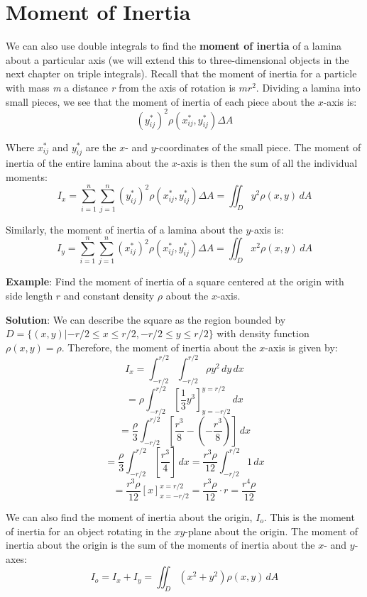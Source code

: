 \section{Moment of Inertia}
We can also use double integrals to find the \textbf{moment of inertia} of a lamina about a particular axis (we will extend this to 
three-dimensional objects in the next chapter on triple integrals). Recall that the
moment of inertia for a particle with mass \textit{m} a distance \textit{r} 
from the axis of rotation is $mr^2$. Dividing a lamina into small pieces, we 
see that the moment of inertia of each piece about the $x$-axis is:
$$\left( y_{ij}^* \right)^2 \rho \left( x_{ij}^* , y_{ij}^* \right) \Delta A$$

Where $x_{ij}^*$ and $y_{ij}^*$ are the $x$- and $y$-coordinates of the small 
piece. The moment of inertia of the entire lamina about the $x$-axis is then 
the sum of all the individual moments:
$$I_x = \sum_{i = 1}^n \sum_{j = 1}^n \left( y_{ij}^* \right)^2 \rho \left( x_{
ij}^* , y_{ij}^* \right) \Delta A = \iint_{\textit{D}} y^2 \rho \left(x, y 
\right) \,dA$$

Similarly, the moment of inertia of a lamina about the $y$-axis is:
$$I_y = \sum_{i = 1}^n \sum_{j = 1}^n \left( x_{ij}^* \right)^2 \rho \left( x_{
ij}^* , y_{ij}^* \right) \Delta A = \iint_{\textit{D}} x^2 \rho \left(x, y 
\right) \,dA$$

\textbf{Example}: Find the moment of inertia of a square centered at the origin
with side length $r$ and constant density $\rho$ about the $x$-axis.

\textbf{Solution}: We can describe the square as the region bounded by $
\textit{D} = \{(x, y)| -r/2 \leq x \leq r/2, -r/2 \leq y \leq r/2 \}$ with 
density function $\rho(x, y) = \rho$. Therefore, the moment of inertia about 
the $x$-axis is given by:
$$I_x = \int_{-r/2}^{r/2} \int_{-r/2}^{r/2} \rho y^2 \,dy\,dx$$
$$= \rho \int_{-r/2}^{r/2} \left[ \frac{1}{3} y^3 \right]_{y = -r/2}^{y = r/2} 
\,dx$$
$$= \frac{\rho}{3} \int_{-r/2}^{r/2} \left[ \frac{r^3}{8} - \left( -\frac{r^3}{
8} \right) \right]\,dx$$
$$= \frac{\rho}{3} \int_{-r/2}^{r/2} \left[ \frac{r^3}{4} \right]\,dx = \frac{
r^3 \rho}{12} \int_{-r/2}^{r/2} 1\,dx$$
$$= \frac{r^3 \rho}{12} \left[ x \right]_{x = -r/2}^{x = r/2} = \frac{r^3 \rho
}{12} \cdot r = \frac{r^4 \rho}{12}$$

We can also find the moment of inertia about the origin, $I_o$. This is the 
moment of inertia for an object rotating in the $xy$-plane about the origin. 
The moment of inertia about the origin is the sum of the moments of inertia 
about the $x$- and $y$-axes:
$$I_o = I_x + I_y = \iint_{\textit{D}} \left( x^2 + y^2 \right) \rho(x, y)\,
dA$$


